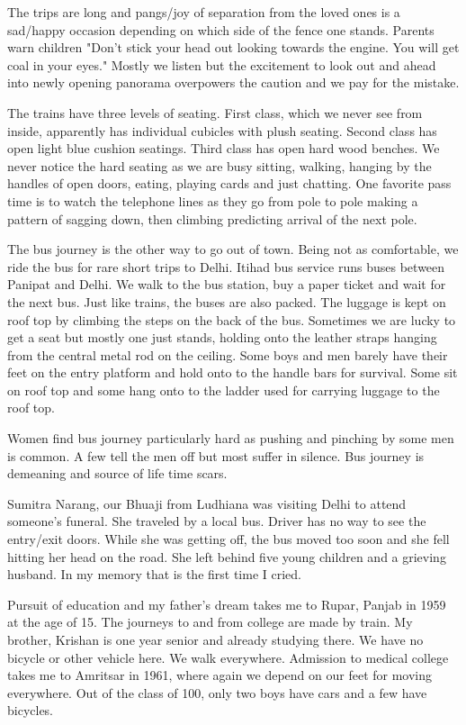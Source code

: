 The trips are long and pangs/joy of separation from the loved ones is
a sad/happy occasion depending on which side of the fence one stands.
Parents warn children "Don't stick your head out looking towards the
engine. You will get coal in your eyes." Mostly we listen but the
excitement to look out and ahead into newly opening panorama overpowers
the caution and we pay for the mistake.

The trains have three levels of seating. First class, which we never see
from inside, apparently has individual cubicles with plush seating. Second
class has open light blue cushion seatings. Third class has open hard wood
benches. We never notice the hard seating as we are busy sitting, walking,
hanging by the handles of open doors, eating, playing cards and just
chatting. One favorite pass time is to watch the telephone lines as they
go from pole to pole making a pattern of sagging down, then climbing
predicting arrival of the next pole.

The bus journey is the other way to go out of town. Being not as
comfortable, we ride the bus for rare short trips to Delhi. Itihad bus
service runs buses between Panipat and Delhi. We walk to the bus station,
buy a paper ticket and wait for the next bus. Just like trains, the buses
are also packed. The luggage is kept on roof top by climbing the steps on
the back of the bus. Sometimes we are lucky to get a seat but mostly one
just stands, holding onto the leather straps hanging from the central
metal rod on the ceiling. Some boys and men barely have their feet on the
entry platform and hold onto to the handle bars for survival. Some sit on
roof top and some hang onto to the ladder used for carrying luggage to the
roof top.

Women find bus journey particularly hard as pushing and pinching by some
men is common. A few tell the men off but most suffer in silence. Bus
journey is demeaning and source of life time scars.

Sumitra Narang, our Bhuaji from Ludhiana was visiting Delhi to attend
someone's funeral. She traveled by a local bus. Driver has no way to see
the entry/exit doors. While she was getting off, the bus moved too soon
and she fell hitting her head on the road. She left behind five young
children and a grieving husband. In my memory that is the first time
I cried.

Pursuit of education and my father’s dream takes me to Rupar, Panjab in
1959 at the age of 15. The journeys to and from college are made by train.
My brother, Krishan is one year senior and already studying there. We have
no bicycle or other vehicle here. We walk everywhere. Admission to medical
college takes me to Amritsar in 1961, where again we depend on our feet
for moving everywhere. Out of the class of 100, only two boys have cars
and a few have bicycles.

